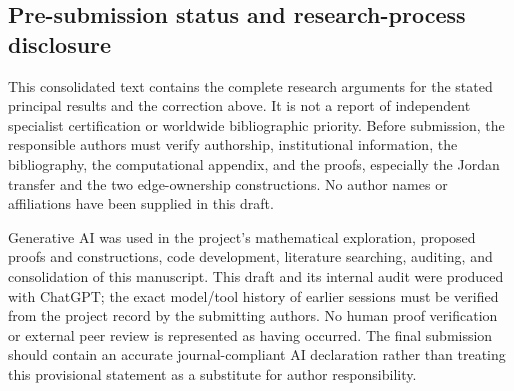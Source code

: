 \subsection{Pre-submission status and research-process disclosure}
This consolidated text contains the complete research arguments for the stated principal results and the correction above. It is not a report of independent specialist certification or worldwide bibliographic priority. Before submission, the responsible authors must verify authorship, institutional information, the bibliography, the computational appendix, and the proofs, especially the Jordan transfer and the two edge-ownership constructions. No author names or affiliations have been supplied in this draft.

Generative AI was used in the project's mathematical exploration, proposed proofs and constructions, code development, literature searching, auditing, and consolidation of this manuscript. This draft and its internal audit were produced with ChatGPT; the exact model/tool history of earlier sessions must be verified from the project record by the submitting authors. No human proof verification or external peer review is represented as having occurred. The final submission should contain an accurate journal-compliant AI declaration rather than treating this provisional statement as a substitute for author responsibility.
